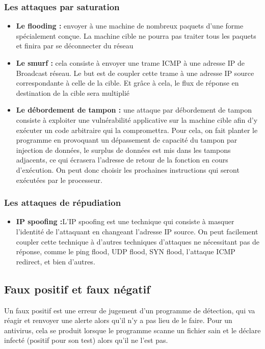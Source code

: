 \subsubsection{Les attaques par saturation}
\begin{itemize}
\item \textbf{Le flooding : }envoyer à une machine de nombreux paquets d'une forme spécialement conçue. La machine cible ne pourra pas traiter tous les paquets et finira par se déconnecter du réseau
\item \textbf{Le smurf : }cela consiste à envoyer une trame ICMP à une adresse IP de Broadcast réseau. Le but est de coupler cette trame à une adresse IP source correspondante à celle de la cible. Et grâce à cela, le flux de réponse en destination de la cible sera multiplié
\item \textbf{Le débordement de tampon : }une attaque par débordement de tampon consiste à exploiter une vulnérabilité  applicative sur la machine cible afin d'y exécuter un code arbitraire qui la compromettra. Pour cela, on fait planter le programme en provoquant un dépassement de capacité du tampon par injection de données, le surplus de données est mis dans les tampons adjacents, ce qui écrasera l'adresse de retour de la fonction en cours d'exécution. On peut donc choisir les prochaines instructions qui seront exécutées par le processeur.
\end{itemize}
\subsubsection{Les attaques de répudiation}
\begin{itemize}
\item \textbf{IP spoofing :}L'IP spoofing est une technique qui consiste à masquer l'identité de l'attaquant en changeant l'adresse IP source. On peut facilement coupler cette technique à d’autres techniques d’attaques ne nécessitant pas de réponse, comme le ping flood, UDP flood, SYN flood, l’attaque ICMP redirect, et bien d’autres.
\end{itemize}
\subsection{Faux positif et faux négatif}


Un faux positif est une erreur de jugement d'un programme de détection, qui va réagir et renvoyer une alerte alors qu'il n'y a pas lieu de le faire. Pour un antivirus, cela se produit lorsque le programme scanne un fichier sain et le déclare infecté (positif pour son test) alors qu'il ne l'est pas.\\


